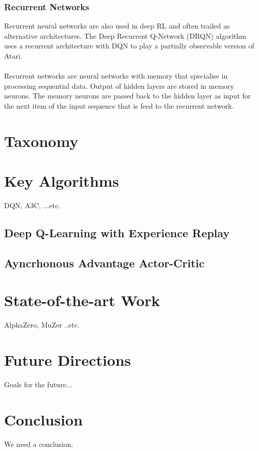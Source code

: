 \documentclass[10pt,journal,compsoc]{IEEEtran}
\begin{document}
\subsubsection{Recurrent Networks}
Recurrent neural networks are also used in deep RL and often trailed as alternative architectures. The Deep Recurrent Q-Network (DRQN) algorithm uses a recurrent architecture with DQN to play a partially observable version of Atari. 
\\\\
Recurrent networks are neural networks with memory that specialise in processing sequential data. Output of hidden layers are stored in memory neurons. The memory neurons are passed back to the hidden layer as input for the next item of the input sequence that is feed to the recurrent network.

\section{Taxonomy}

\section{Key Algorithms}
DQN, A3C, ...etc.
\subsection{Deep Q-Learning with Experience Replay}
\subsection{Ayncrhonous Advantage Actor-Critic}

\section{State-of-the-art Work}
AlphaZero, MuZer ..etc.

\section{Future Directions}
Goals for the future...

\section{Conclusion}
We need a conclusion.

\end{document}
